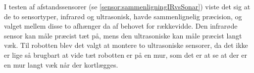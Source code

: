 I testen af afstandssensorer (se \cref{sensor:sammenligningIRvsSonar}) viste det sig at de to sensortyper, infrarød og ultrasonisk, havde sammenlignelig præcision, og valget mellem disse to afhænger da af behovet for rækkevidde. 
Den infrarøde sensor kan måle præcist tæt på, mens den ultrasoniske kan måle præcist langt væk.
Til robotten blev det valgt at montere to ultrasoniske sensorer, da det ikke er lige så brugbart at vide tæt robotten er på en mur, som det er at se at der er en mur langt væk når der kortlægges.